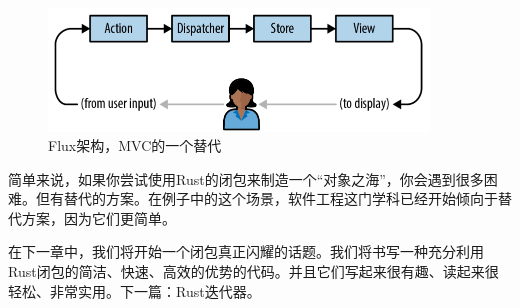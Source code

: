 \begin{figure}[htbp]
    \centering
    \includegraphics[width=0.9\textwidth]{../img/f14-4.png}
    \caption{Flux架构，MVC的一个替代}
    \label{f14-4}
\end{figure}

简单来说，如果你尝试使用Rust的闭包来制造一个“对象之海”，你会遇到很多困难。但有替代的方案。在例子中的这个场景，软件工程这门学科已经开始倾向于替代方案，因为它们更简单。

在下一章中，我们将开始一个闭包真正闪耀的话题。我们将书写一种充分利用Rust闭包的简洁、快速、高效的优势的代码。并且它们写起来很有趣、读起来很轻松、非常实用。下一篇：Rust迭代器。
